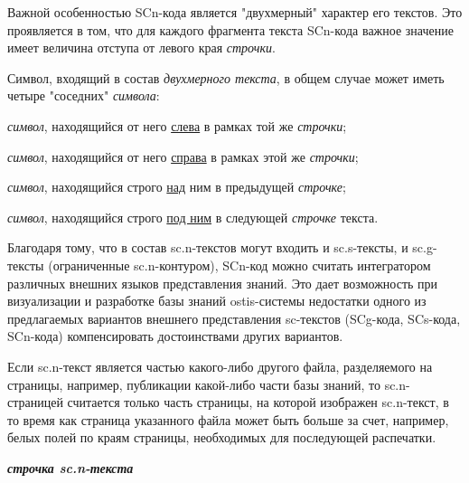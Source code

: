 \begin{SCn}
\end{SCn}

Важной особенностью SCn-кода является "двухмерный"{} характер его текстов. Это проявляется в том, что для каждого фрагмента текста SCn-кода важное значение имеет величина отступа от левого края \textit{строчки}.

Символ, входящий в состав \textit{двухмерного текста}, в общем случае может иметь четыре "соседних"{} \textit{символа}: 
\begin{textitemize}
	\item \textit{символ}, находящийся от него \uline{слева} в рамках той же \textit{строчки};
	\item \textit{символ}, находящийся от него \uline{справа} в рамках этой же \textit{строчки};
	\item \textit{символ}, находящийся строго \uline{над} ним в предыдущей \textit{строчке};
	\item \textit{символ}, находящийся строго \uline{под ним} в следующей \textit{строчке} текста.
\end{textitemize}


Благодаря тому, что в состав sc.n-текстов могут входить и sc.s-тексты, и sc.g-тексты (ограниченные sc.n-контуром), SCn-код можно считать интегратором различных внешних языков представления знаний.  Это дает возможность при визуализации и разработке базы знаний ostis-системы недостатки одного из предлагаемых вариантов внешнего представления sc-текстов (SCg-кода, SCs-кода, SCn-кода) компенсировать достоинствами других вариантов.

\begin{SCn}
\end{SCn}

Если sc.n-текст является частью какого-либо другого файла, разделяемого на страницы, например, публикации какой-либо части базы знаний, то sc.n-страницей считается только часть страницы, на которой изображен sc.n-текст, в то время как страница указанного файла может быть больше за счет, например, белых полей по краям страницы, необходимых для последующей распечатки.


\textbf{\textit{строчка sc.n-текста}}

